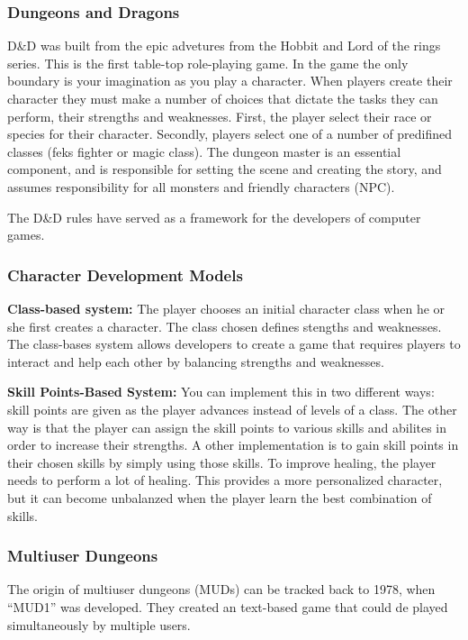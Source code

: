     \subsubsection*{Dungeons and Dragons}
    D\&D was built from the epic advetures from the Hobbit and Lord of the rings series. This is the first table-top role-playing game. In the game the only boundary is your imagination as you play a character. When players create their character they must make a number of choices that dictate the tasks they can perform, their strengths and weaknesses. First, the player select their race or species for their character. Secondly, players select one of a number of predifined classes (feks fighter or magic class). The dungeon master is an essential component, and is responsible for setting the scene and creating the story, and assumes responsibility for all monsters and friendly characters (NPC). 

    The D\&D rules have served as a framework for the developers of computer games.  
    
    \subsubsection*{Character Development Models}

    {\bf Class-based system:} The player chooses an initial character class when he or she first creates a character. The class chosen defines stengths and weaknesses. The class-bases system allows developers to create a game that requires players to interact and help each other by balancing strengths and weaknesses. 

    {\bf Skill Points-Based System:} You can implement this in two different ways: skill points are given as the player advances instead of levels of a class. The other way is that the player can assign the skill points to various skills and abilites in order to increase their strengths. A other implementation is to gain skill points in their chosen skills by simply using those skills. To improve healing, the player needs to perform a lot of healing. 
    This provides a more personalized character, but it can become unbalanzed when the player learn the best combination of skills. 

    \subsubsection*{Multiuser Dungeons}
    The origin of multiuser dungeons (MUDs) can be tracked back to 1978, when ``MUD1'' was developed. They created an text-based game that could de played simultaneously by multiple users. 

